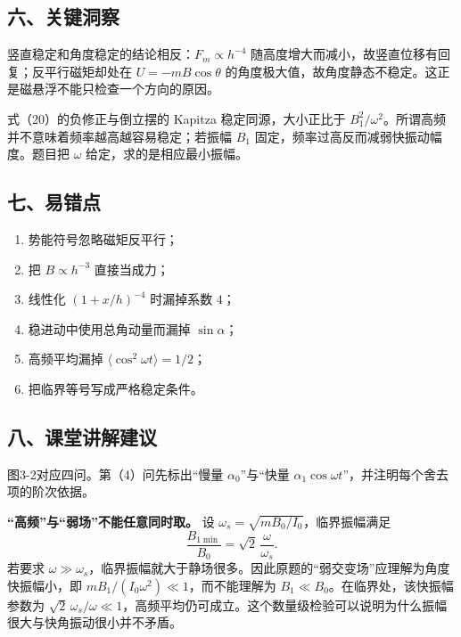 \documentclass[12pt,a4paper,UTF8]{ctexart}
\newcommand{\tightlist}{\setlength{\itemsep}{0pt}\setlength{\parskip}{0pt}}
\begin{document}
\subsection{六、关键洞察}\label{ux516dux5173ux952eux6d1eux5bdf-2}

竖直稳定和角度稳定的结论相反：\(F_m\propto h^{-4}\)
随高度增大而减小，故竖直位移有回复；反平行磁矩却处在 \(U=-mB\cos\theta\)
的角度极大值，故角度静态不稳定。这正是磁悬浮不能只检查一个方向的原因。

式（20）的负修正与倒立摆的 Kapitza 稳定同源，大小正比于
\(B_1^2/\omega^2\)。所谓高频并不意味着频率越高越容易稳定；若振幅 \(B_1\)
固定，频率过高反而减弱快振动幅度。题目把 \(\omega\)
给定，求的是相应最小振幅。

\subsection{七、易错点}\label{ux4e03ux6613ux9519ux70b9-2}

\begin{enumerate}
\def\labelenumi{\arabic{enumi}.}
\tightlist
\item
  势能符号忽略磁矩反平行；
\item
  把 \(B\propto h^{-3}\) 直接当成力；
\item
  线性化 \((1+x/h)^{-4}\) 时漏掉系数 \(4\)；
\item
  稳进动中使用总角动量而漏掉 \(\sin\alpha\)；
\item
  高频平均漏掉 \(\langle\cos^2\omega t\rangle=1/2\)；
\item
  把临界等号写成严格稳定条件。
\end{enumerate}

\subsection{八、课堂讲解建议}\label{ux516bux8bfeux5802ux8bb2ux89e3ux5efaux8bae-2}

图3-2对应四问。第（4）问先标出``慢量 \(\alpha_0\)''与``快量
\(\alpha_1\cos\omega t\)''，并注明每个舍去项的阶次依据。

\textbf{``高频''与``弱场''不能任意同时取。} 设
\(\omega_s=\sqrt{mB_0/I_0}\)，临界振幅满足 \[
\frac{B_{1\min}}{B_0}=\sqrt2\,\frac{\omega}{\omega_s}.
\] 若要求
\(\omega\gg\omega_s\)，临界振幅就大于静场很多。因此原题的``弱交变场''应理解为角度快振幅小，即
\(mB_1/(I_0\omega^2)\ll1\)，而不能理解为
\(B_1\ll B_0\)。在临界处，该快振幅参数为
\(\sqrt2\,\omega_s/\omega\ll1\)，高频平均仍可成立。这个数量级检验可以说明为什么振幅很大与快角振动很小并不矛盾。
\end{document}
